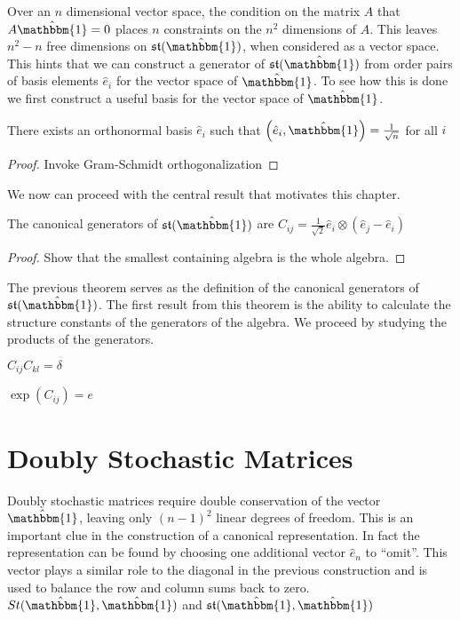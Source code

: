 Over an $n$ dimensional vector space, the condition on the matrix $A$ that $A \hat{\mathbbm{1}} = 0$
places $n$ constraints on the $n^2$ dimensions of $A$. This leaves $n^2 - n$ 
free dimensions on $\mathfrak{st}(\hat{\mathbbm{1}})$, when considered as a
vector space. This hints that we can construct a generator of $\mathfrak{st}(\hat{\mathbbm{1}})$
from order pairs of basis elements $\hat{e}_i$ for the vector space of $\hat{\mathbbm{1}}$.
To see how this is done we first construct a useful basis for the vector space
of $\hat{\mathbbm{1}}$.

\begin{lemma}
	There exists an orthonormal basis $\hat{e}_i$ such that $\left(\hat{e}_i, \hat{\mathbbm{1}} \right) = \frac{1}{\sqrt{n}}$
	for all $i$
\end{lemma}

\begin{proof}
	Invoke Gram-Schmidt orthogonalization
\end{proof}

We now can proceed with the central result that motivates this chapter.

\begin{theorem}
	The canonical generators of $\mathfrak{st}(\hat{\mathbbm{1}})$ are $C_{ij} = \frac{1}{\sqrt{2}} \hat{e}_i \otimes \left( \hat{e}_j - \hat{e}_i \right)$
\end{theorem}

\begin{proof}
	Show that the smallest containing algebra is the whole algebra.
\end{proof}

The previous theorem serves as the definition of the canonical generators of $\mathfrak{st}(\hat{\mathbbm{1}})$.
The first result from this theorem is the ability to calculate the structure
constants of the generators of the algebra. We proceed by studying the products
of the generators.

\begin{corollary}
	$C_{ij}C_{kl} = \delta$
\end{corollary}

\begin{corollary}
	$\exp\left(C_{ij}\right) = e$
\end{corollary}


\section{Doubly Stochastic Matrices}
Doubly stochastic matrices require double conservation of the vector $\hat{\mathbbm{1}}$, leaving
only $\left(n - 1\right)^2$ linear degrees of freedom. This is an important clue in the construction
of a canonical representation. In fact the representation can be found by choosing one additional
vector $\hat{e}_n$ to ``omit''. This vector plays a similar role to the diagonal in the previous
construction and is used to balance the row and column sums back to zero.
$St(\hat{\mathbbm{1}},\hat{\mathbbm{1}})$ and $\mathfrak{st}(\hat{\mathbbm{1}},\hat{\mathbbm{1}})$
